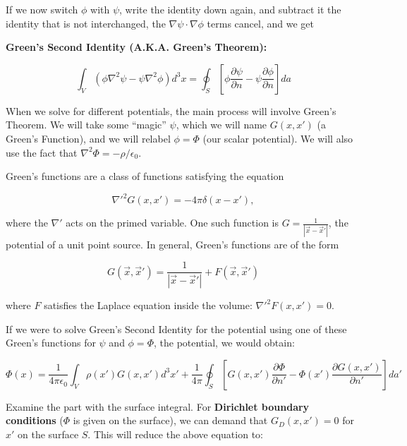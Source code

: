 \documentclass[a4paper,twoside,master.tex]{subfiles}
\begin{document}
If we now switch $\phi$ with $\psi$, write the identity down again, and subtract it the identity that is not interchanged, the $\nabla\psi\cdot\nabla\phi$ terms cancel, and we get
\begin{definition}
    \textbf{Green's Second Identity (A.K.A. Green's Theorem):}

    \begin{equation}
        \int_V(\phi\nabla^2\psi - \psi\nabla^2\phi)d^3x = \oint_S\left[\phi\frac{\partial\psi}{\partial n}-\psi\frac{\partial\phi}{\partial n}\right]da
    \end{equation}

\end{definition}

When we solve for different potentials, the main process will involve Green's Theorem. We will take some ``magic'' $\psi$, which we will name $G(x,x')$ (a Green's Function), and we will relabel $\phi=\Phi$ (our scalar potential). We will also use the fact that $\nabla^2\Phi = -\rho/\epsilon_0$.

Green's functions are a class of functions satisfying the equation

\begin{equation}
    \nabla'^2 G(x,x') = -4\pi\delta(x-x'),
\end{equation}

where the $\nabla'$ acts on the primed variable. One such function is $G = \frac{1}{|\vec{x}-\vec{x}'|}$, the potential of a unit point source. In general, Green's functions are of the form

\begin{equation}
    G(\vec{x},\vec{x}') = \frac{1}{|\vec{x}-\vec{x}'|} + F(\vec{x},\vec{x}')
\end{equation}
    
where $F$ satisfies the Laplace equation inside the volume: $\nabla'^2 F(x,x') = 0$.

If we were to solve Green's Second Identity for the potential using one of these Green's functions for $\psi$ and $\phi = \Phi$, the potential, we would obtain:

\begin{equation}
    \Phi(x) = \frac{1}{4\pi\epsilon_0}\int_V\rho(x')G(x,x')d^3x' + \frac{1}{4\pi}\oint_S\left[G(x,x')\frac{\partial\Phi}{\partial n'} - \Phi(x')\frac{\partial G(x,x')}{\partial n'}\right]da'
\end{equation}

Examine the part with the surface integral. For \textbf{Dirichlet boundary conditions} ($\Phi$ is given on the surface), we can demand that $G_D(x,x') = 0$ for $x'$ on the surface $S$. This will reduce the above equation to:
\end{document}
